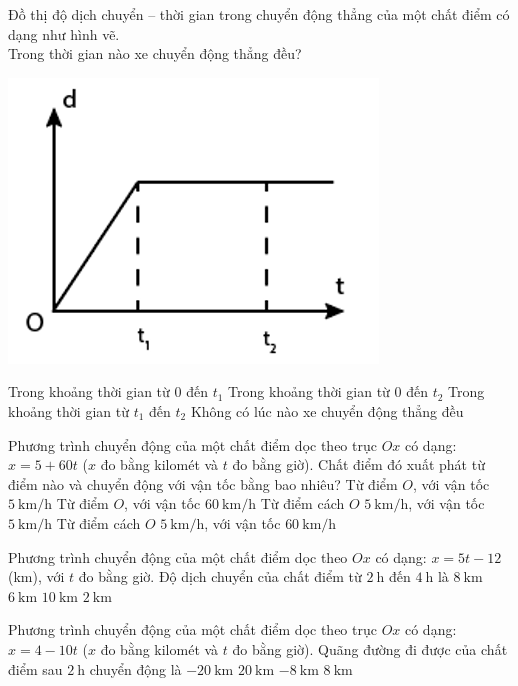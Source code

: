 \begin{ex}
	Đồ thị độ dịch chuyển – thời gian trong chuyển động thẳng của một chất điểm có dạng như hình vẽ.\\
	Trong thời gian nào xe chuyển động thẳng đều?
	\begin{center}
		\includegraphics[width=0.25\linewidth]{figs/VN10-2023-PH-TP005-P-4}
	\end{center}
	\choice
	{\True Trong khoảng thời gian từ $0$ đến $t_1$}
	{Trong khoảng thời gian từ $0$ đến $t_2$}
	{Trong khoảng thời gian từ $t_1$ đến $t_2$}
	{Không có lúc nào xe chuyển động thẳng đều}
	\loigiai{}
\end{ex}
\begin{ex}
	Phương trình chuyển động của một chất điểm dọc theo trục $Ox$ có dạng: $x = 5 + 60t$ ($x$ đo bằng kilomét và $t$ đo bằng giờ). Chất điểm đó xuất phát từ điểm nào và chuyển động với vận tốc bằng bao nhiêu?
	\choice
	{Từ điểm $O$, với vận tốc $\SI{5}{\kilo\meter/\hour}$}
	{Từ điểm $O$, với vận tốc $\SI{60}{\kilo\meter/\hour}$}
	{Từ điểm cách $O$ $\SI{5}{\kilo\meter/\hour}$, với vận tốc $\SI{5}{\kilo\meter/\hour}$}
	{\True Từ điểm cách $O$ $\SI{5}{\kilo\meter/\hour}$, với vận tốc $\SI{60}{\kilo\meter/\hour}$}
	\loigiai{}
\end{ex}
\begin{ex}
	Phương trình chuyển động của một chất điểm dọc theo $Ox$ có dạng: $x=5t-12$ (km), với $t$ đo bằng giờ. Độ dịch chuyển của chất điểm từ $\SI{2}{\hour}$ đến $\SI{4}{\hour}$ là	
	\choice
	{$\SI{8}{\kilo\meter}$}
	{$\SI{6}{\kilo\meter}$}
	{\True $\SI{10}{\kilo\meter}$}
	{$\SI{2}{\kilo\meter}$}
	\loigiai{}
\end{ex}
\begin{ex}
	Phương trình chuyển động của một chất điểm dọc theo trục $Ox$ có dạng: $x = 4 -10t$ ($x$ đo bằng kilomét và $t$ đo bằng giờ). Quãng đường đi được của chất điểm sau $\SI{2}{\hour}$ chuyển động là
	\choice
	{$\SI{-20}{\kilo\meter}$}
	{\True $\SI{20}{\kilo\meter}$}
	{$\SI{-8}{\kilo\meter}$}
	{$\SI{8}{\kilo\meter}$}
	\loigiai{}
\end{ex}

